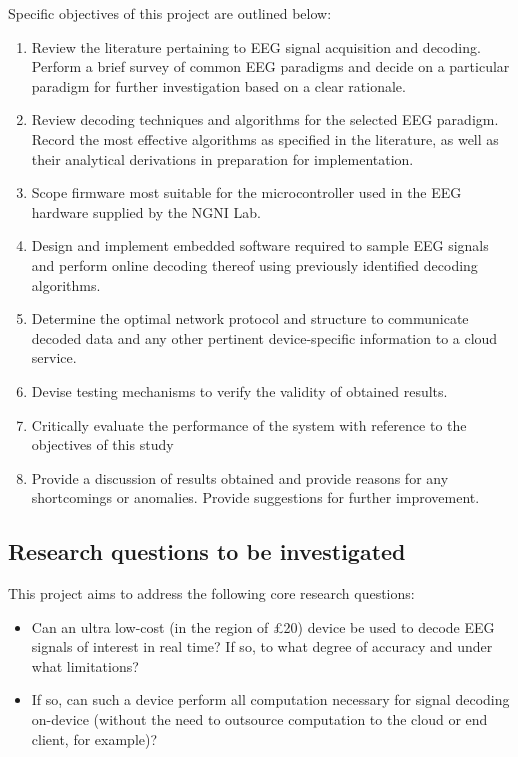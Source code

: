 Specific objectives of this project are outlined below:
\begin{enumerate}
    \item Review the literature pertaining to EEG signal acquisition and decoding. Perform a brief survey of common EEG paradigms and decide on a particular paradigm for further investigation based on a clear rationale. 
    \item Review decoding techniques and algorithms for the selected EEG paradigm. Record the most effective algorithms as specified in the literature, as well as their analytical derivations in preparation for implementation. 
    \item Scope firmware most suitable for the microcontroller used in the EEG hardware supplied by the NGNI Lab.
    \item Design and implement embedded software required to sample EEG signals and perform online decoding thereof using previously identified decoding algorithms.
    \item Determine the optimal network protocol and structure to communicate decoded data and any other pertinent device-specific information to a cloud service.
    \item Devise testing mechanisms to verify the validity of obtained results.
    \item Critically evaluate the performance of the system with reference to the objectives of this study 
    \item Provide a discussion of results obtained and provide reasons for any shortcomings or anomalies. Provide suggestions for further improvement.
    
\end{enumerate}


\subsection{Research questions to be investigated}
\label{section:research-questions}
This project aims to address the following core research questions: 
\begin{itemize}
    \item Can an ultra low-cost (in the region of £20) device be used to decode EEG signals of interest in real time? If so, to what degree of accuracy and under what limitations?
    \item If so, can such a device perform all computation necessary for signal decoding on-device (without the need to outsource computation to the cloud or end client, for example)? 
\end{itemize}
